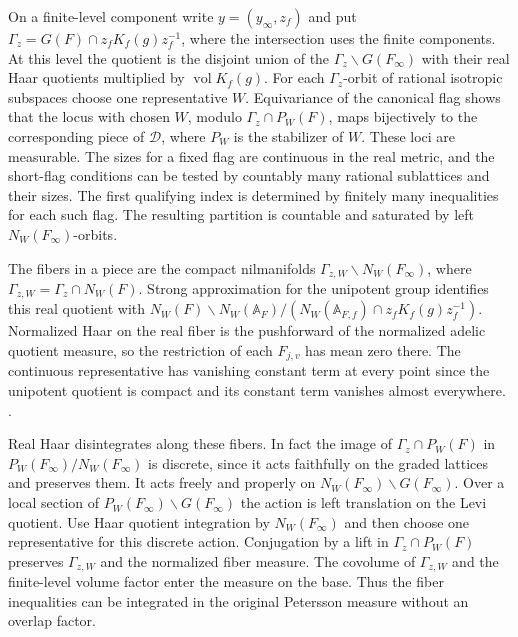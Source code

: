 On a finite-level component write \(y=(y_\infty,z_f)\) and put
\(\Gamma_z=G(F)\cap z_f K_f(g) z_f^{-1}\), where the intersection
uses the finite components. At this level the quotient is the
disjoint union of the \(\Gamma_z\backslash G(F_\infty)\) with
their real Haar quotients multiplied by \(\operatorname{vol}K_f(g)\).
For each \(\Gamma_z\)-orbit of rational isotropic subspaces choose one
representative \(W\). Equivariance of the canonical flag shows that
the locus with chosen \(W\), modulo \(\Gamma_z\cap P_W(F)\), maps
bijectively to the corresponding piece of \(\mathscr D\), where \(P_W\) is
the stabilizer of \(W\). These loci are measurable. The sizes for a
fixed flag are continuous in the real metric, and the short-flag
conditions can be tested by countably many rational sublattices and
their sizes. The first qualifying index is determined by finitely
many inequalities for each such flag. The resulting partition is
countable and saturated by left \(N_W(F_\infty)\)-orbits.

The fibers in a piece are the compact nilmanifolds
\(\Gamma_{z,W}\backslash N_W(F_\infty)\), where
\(\Gamma_{z,W}=\Gamma_z\cap N_W(F)\). Strong approximation for the
unipotent group identifies this real quotient with
\(N_W(F)\backslash N_W(\mathbb A_F)/
 (N_W(\mathbb A_{F,f})\cap z_f K_f(g)z_f^{-1})\).
Normalized Haar on the real fiber is the pushforward of the
normalized adelic quotient measure, so the restriction of each
\(F_{j,v}\) has mean zero there. The continuous representative has
vanishing constant term at every point since the unipotent quotient
is compact and its constant term vanishes almost everywhere.
.

Real Haar disintegrates along these fibers. In fact the image of
\(\Gamma_z\cap P_W(F)\) in \(P_W(F_\infty)/N_W(F_\infty)\) is
discrete, since it acts faithfully on the graded lattices and
preserves them. It acts freely and properly on
\(N_W(F_\infty)\backslash G(F_\infty)\). Over a local section of
\(P_W(F_\infty)\backslash G(F_\infty)\) the action is left
translation on the Levi quotient. Use Haar quotient integration by
\(N_W(F_\infty)\) and then choose one representative for this discrete
action. Conjugation by a lift in \(\Gamma_z\cap P_W(F)\) preserves
\(\Gamma_{z,W}\) and the normalized fiber measure. The covolume of
\(\Gamma_{z,W}\) and the finite-level volume factor enter the measure
on the base. Thus the fiber inequalities can be integrated in the
original Petersson measure without an overlap factor.

